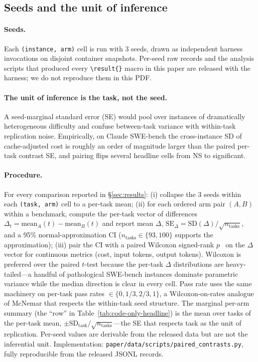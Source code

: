 \subsection{Seeds and the unit of inference}
\label{sec:setup-inference}

\paragraph{Seeds.} Each \texttt{(instance, arm)} cell is run with
3 seeds, drawn as independent harness invocations on disjoint
container snapshots. Per-seed raw records and the analysis scripts
that produced every \verb|\result{}| macro in this paper are released with
the harness; we do not reproduce them in this PDF.

\paragraph{The unit of inference is the task, not the seed.} A
seed-marginal standard error (SE) would pool over instances of dramatically heterogeneous
difficulty and confuse between-task variance with within-task
replication noise. Empirically, on Claude SWE-bench the cross-instance
SD of cache-adjusted cost is roughly an order of magnitude larger than
the paired per-task contrast SE, and pairing flips several headline
cells from NS to significant.

\paragraph{Procedure.} For every comparison reported in
\S\ref{sec:results}: (i) collapse the 3 seeds within each
\texttt{(task, arm)} cell to a per-task mean; (ii) for each ordered arm
pair $(A, B)$ within a benchmark, compute the per-task vector of
differences $\Delta_t = \mathrm{mean}_A(t) - \mathrm{mean}_B(t)$ and
report mean $\Delta$, $\mathrm{SE}_\Delta = \mathrm{SD}(\Delta) /
\sqrt{n_{\text{tasks}}}$, and a 95\% normal-approximation CI
($n_{\text{tasks}} \in \{93, 100\}$ supports the approximation); (iii)
pair the CI with a paired Wilcoxon signed-rank
$p$~\cite{wilcoxon1945} on the $\Delta$ vector for continuous metrics
(cost, input tokens, output tokens). Wilcoxon is preferred over the
paired $t$-test because the per-task $\Delta$ distributions are
heavy-tailed---a handful of pathological SWE-bench instances dominate
parametric variance while the median direction is clear in every cell.
Pass rate uses the same machinery on per-task pass rates
$\in \{0, 1/3, 2/3, 1\}$, a Wilcoxon-on-rates analogue of McNemar that
respects the within-task seed structure. The marginal per-arm summary
(the ``row'' in Table~\ref{tab:code-only-headline}) is the mean over
tasks of the per-task mean, $\pm \mathrm{SD}_{\text{task}} /
\sqrt{n_{\text{tasks}}}$---the SE that respects task as the unit of
replication. Per-seed values are derivable from the released data but
are not the inferential unit. Implementation:
\texttt{paper/\allowbreak data/\allowbreak scripts/\allowbreak paired\allowbreak\_contrasts.py}, fully reproducible
from the released JSONL records.

